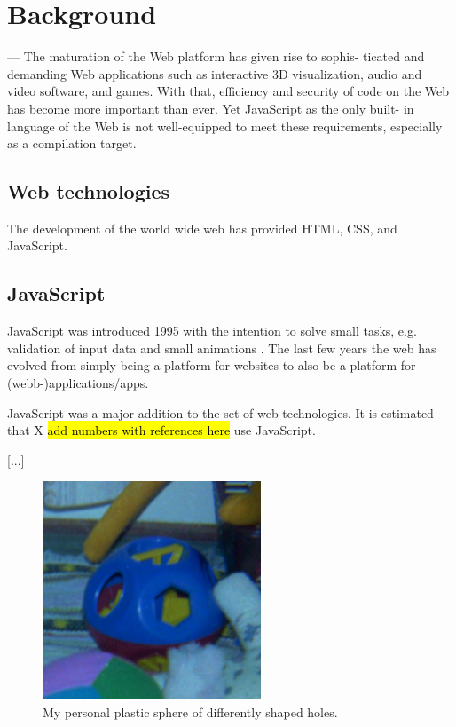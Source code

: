 \section{Background}

--- The maturation of the Web platform has given rise to sophis- ticated and demanding Web applications such as interactive 3D visualization, audio and video software, and games. With that, efficiency and security of code on the Web has become more important than ever. Yet JavaScript as the only built- in language of the Web is not well-equipped to meet these requirements, especially as a compilation target.



\subsection*{Web technologies}

The development of the world wide web has provided HTML, CSS, and JavaScript.

\subsection{JavaScript}

JavaScript was introduced 1995 with the intention to solve small tasks, e.g. validation of input data and small animations \parencite{Moller2018}. The last few years the web has evolved from simply being a platform for websites to also be a platform for (webb-)applications/apps.

JavaScript was a major addition to the set of web technologies. It is estimated that X \hl{add numbers with references here} use JavaScript.

[...]

\begin{figure}[!h]
\centering
\includegraphics[width=6.5cm,height=6.5cm,keepaspectratio]{toy}
\caption{My personal plastic sphere of differently shaped holes.}
\label{toy}
\end{figure}


